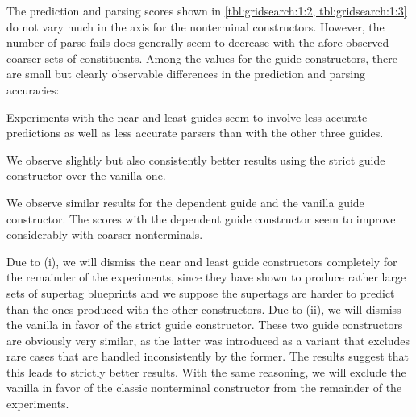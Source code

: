 \documentclass[../../document.tex]{subfiles}
\begin{document}
    The prediction and parsing scores shown in \cref{tbl:gridsearch:1:2, tbl:gridsearch:1:3} do not vary much in the axis for the nonterminal constructors.
    However, the number of parse fails does generally seem to decrease with the afore observed coarser sets of constituents.
    Among the values for the guide constructors, there are small but clearly observable differences in the prediction and parsing accuracies:
    \begin{compactenum}
        \item Experiments with the near and least guides seem to involve less accurate predictions as well as less accurate parsers than with the other three guides.
        \item We observe slightly but also consistently better results using the strict guide constructor over the vanilla one.
        \item We observe similar results for the dependent guide and the vanilla guide constructor. The scores with the dependent guide constructor seem to improve considerably with coarser nonterminals.
    \end{compactenum}

    Due to (i), we will dismiss the near and least guide constructors completely for the remainder of the experiments, since they have shown to produce rather large sets of supertag blueprints and we suppose the supertags are harder to predict than the ones produced with the other constructors.
    Due to (ii), we will dismiss the vanilla in favor of the strict guide constructor.
    These two guide constructors are obviously very similar, as the latter was introduced as a variant that excludes rare cases that are handled inconsistently by the former.
    The results suggest that this leads to strictly better results.
    With the same reasoning, we will exclude the vanilla in favor of the classic nonterminal constructor from the remainder of the experiments.
    
\end{document}
